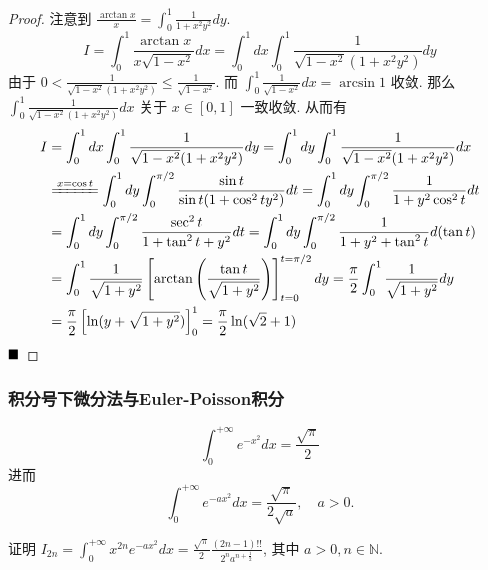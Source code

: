 \documentclass[lang=cn,newtx,10pt,scheme=chinese]{elegantbook}
\begin{document}
\begin{proof}
注意到 $\frac{\arctan x}{x} = \int_0^1 \frac{1}{1+x^2y^2} dy$.
$$ I = \int_0^1 \frac{\arctan x}{x \sqrt{1-x^2}} dx = \int_0^1 dx \int_0^1 \frac{1}{\sqrt{1-x^2}(1+x^2y^2)} dy $$
由于 $0 < \frac{1}{\sqrt{1-x^2}(1+x^2y^2)} \le \frac{1}{\sqrt{1-x^2}}$. 而 $\int_0^1 \frac{1}{\sqrt{1-x^2}} dx = \arcsin 1$ 收敛.
那么 $\int_0^1 \frac{1}{\sqrt{1-x^2}(1+x^2y^2)} dx$ 关于 $x \in [0,1]$ 一致收敛.
从而有
\begin{align*}
I &= \int_0^1 dx \int_0^1 \frac{1}{\sqrt{1-x^2}(1+x^2y^2)} dy = \int_0^1 dy \int_0^1 \frac{1}{\sqrt{1-x^2}(1+x^2y^2)} dx \\
&\xlongequal{x=\cos t} \int_0^1 dy \int_0^{\pi/2} \frac{\sin t}{\sin t(1+\cos^2 t y^2)} dt = \int_0^1 dy \int_0^{\pi/2} \frac{1}{1+y^2\cos^2 t} dt \\
&= \int_0^1 dy \int_0^{\pi/2} \frac{\sec^2 t}{1+\tan^2 t + y^2} dt = \int_0^1 dy \int_0^{\pi/2} \frac{1}{1+y^2+\tan^2 t} d(\tan t) \\
&= \int_0^1 \frac{1}{\sqrt{1+y^2}} \left[ \arctan\left(\frac{\tan t}{\sqrt{1+y^2}}\right) \right]_{t=0}^{t=\pi/2} dy = \frac{\pi}{2} \int_0^1 \frac{1}{\sqrt{1+y^2}} dy \\
&= \frac{\pi}{2} \left[ \ln(y+\sqrt{1+y^2}) \right]_0^1 = \frac{\pi}{2} \ln(\sqrt{2}+1)
\end{align*}
$\hfill \blacksquare$
\end{proof}

\subsubsection{积分号下微分法与Euler-Poisson积分}

\begin{proposition*}
    $$\int_{0}^{+\infty} e^{-x^2} dx = \frac{\sqrt{\pi}}{2}$$
    进而
 $$\int_{0}^{+\infty} e^{-ax^2} dx = \frac{\sqrt{\pi}}{2\sqrt{a}}, \quad a > 0. $$
\end{proposition*}

\begin{example}
证明 $I_{2n} = \int_{0}^{+\infty} x^{2n} e^{-ax^2} dx = \frac{\sqrt{\pi}}{2} \frac{(2n-1)!!}{2^n a^{n+\frac{1}{2}}}$, 其中 $a>0, n \in \mathbb{N}$.
\end{example}
\end{document}
